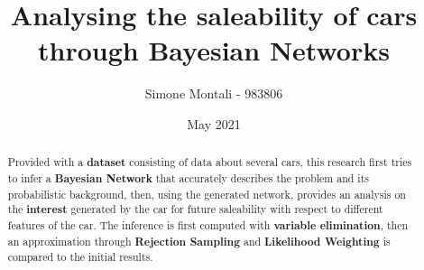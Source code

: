\documentclass[10pt,a4paper]{article}
\begin{document}
\title{Analysing the saleability of cars through Bayesian Networks} %
\author{Simone Montali - 983806}
\date{May 2021} %
\maketitle %




\begin{abstract}
\normalsize
Provided with a \textbf{dataset} consisting of data about several cars, this research first tries to infer a \textbf{Bayesian Network} that accurately describes the problem and its probabilistic background, then, using the generated network, provides an analysis on the \textbf{interest} generated by the car for future saleability with respect to different features of the car. The inference is first computed with \textbf{variable elimination}, then an approximation through \textbf{Rejection Sampling} and \textbf{Likelihood Weighting} is compared to the initial results.

\end{abstract}

\setcounter{tocdepth}{2}
\tableofcontents


\clearpage








\clearpage


\clearpage
{}

\end{document}
